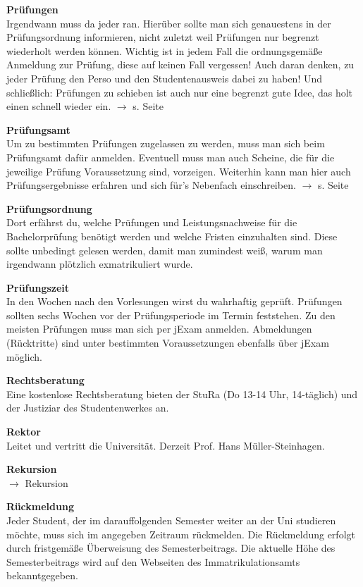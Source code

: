 \begin{multicols}{2}
\vfill\columnbreak

\textbf{Prüfungen} \\
Irgendwann muss da jeder ran.
Hierüber sollte man sich genauestens in der Prüfungsordnung informieren, nicht zuletzt weil Prüfungen nur begrenzt wiederholt werden können.
Wichtig ist in jedem Fall die ordnungsgemäße Anmeldung zur Prüfung, diese auf keinen Fall vergessen!
Auch daran denken, zu jeder Prüfung den Perso und den Studentenausweis dabei zu haben!
Und schließlich: Prüfungen zu schieben ist auch nur eine begrenzt gute Idee, das holt einen schnell wieder ein.
$\rightarrow$ s. Seite \pageref{sec:pruefungen}

\textbf{Prüfungsamt} \\
Um zu bestimmten Prüfungen zugelassen zu werden, muss man sich beim Prüfungsamt dafür anmelden.
Eventuell muss man auch Scheine, die für die jeweilige Prüfung Voraussetzung sind, vorzeigen.
Weiterhin kann man hier auch Prüfungsergebnisse erfahren und sich für's Nebenfach einschreiben.
$\rightarrow$ s. Seite \pageref{sec:pruefungsamt}

\textbf{Prüfungsordnung} \\
Dort erfährst du, welche Prüfungen und Leistungsnachweise für die Bachelorprüfung benötigt werden und welche Fristen einzuhalten sind.
Diese sollte unbedingt gelesen werden, damit man zumindest weiß, warum man irgendwann plötzlich exmatrikuliert wurde.

\textbf{Prüfungszeit} \\
In den Wochen nach den Vorlesungen wirst du wahrhaftig geprüft.
Prüfungen sollten sechs Wochen vor der Prüfungsperiode im Termin feststehen.
Zu den meisten Prüfungen muss man sich per jExam anmelden.
Abmeldungen (Rücktritte) sind unter bestimmten Voraussetzungen ebenfalls über jExam möglich.

\textbf{Rechtsberatung} \\
Eine kostenlose Rechtsberatung bieten der StuRa (Do 13-14 Uhr, 14-täglich) und der Justiziar des Studentenwerkes an.  %

\textbf{Rektor} \\
Leitet und vertritt die Universität.
Derzeit Prof. Hans Müller-Steinhagen.

\textbf{Rekursion} \\
$\rightarrow$ Rekursion

\textbf{Rückmeldung} \\
Jeder Student, der im darauffolgenden Semester weiter an der Uni studieren möchte, muss sich im angegeben Zeitraum rückmelden.
Die Rückmeldung erfolgt durch fristgemäße Überweisung des Semesterbeitrags.
Die aktuelle Höhe des Semesterbeitrags wird auf den Webseiten des Immatrikulationsamts bekanntgegeben. 


\end{multicols}
